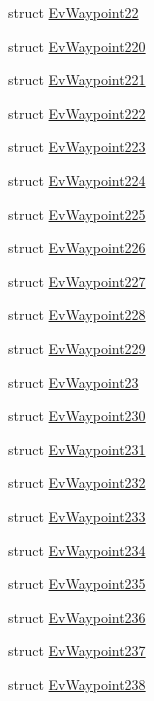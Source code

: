 \begin{DoxyCompactItemize}
struct \hyperlink{structcl__move__base__z_1_1EvWaypoint22}{Ev\+Waypoint22}
\item 
struct \hyperlink{structcl__move__base__z_1_1EvWaypoint220}{Ev\+Waypoint220}
\item 
struct \hyperlink{structcl__move__base__z_1_1EvWaypoint221}{Ev\+Waypoint221}
\item 
struct \hyperlink{structcl__move__base__z_1_1EvWaypoint222}{Ev\+Waypoint222}
\item 
struct \hyperlink{structcl__move__base__z_1_1EvWaypoint223}{Ev\+Waypoint223}
\item 
struct \hyperlink{structcl__move__base__z_1_1EvWaypoint224}{Ev\+Waypoint224}
\item 
struct \hyperlink{structcl__move__base__z_1_1EvWaypoint225}{Ev\+Waypoint225}
\item 
struct \hyperlink{structcl__move__base__z_1_1EvWaypoint226}{Ev\+Waypoint226}
\item 
struct \hyperlink{structcl__move__base__z_1_1EvWaypoint227}{Ev\+Waypoint227}
\item 
struct \hyperlink{structcl__move__base__z_1_1EvWaypoint228}{Ev\+Waypoint228}
\item 
struct \hyperlink{structcl__move__base__z_1_1EvWaypoint229}{Ev\+Waypoint229}
\item 
struct \hyperlink{structcl__move__base__z_1_1EvWaypoint23}{Ev\+Waypoint23}
\item 
struct \hyperlink{structcl__move__base__z_1_1EvWaypoint230}{Ev\+Waypoint230}
\item 
struct \hyperlink{structcl__move__base__z_1_1EvWaypoint231}{Ev\+Waypoint231}
\item 
struct \hyperlink{structcl__move__base__z_1_1EvWaypoint232}{Ev\+Waypoint232}
\item 
struct \hyperlink{structcl__move__base__z_1_1EvWaypoint233}{Ev\+Waypoint233}
\item 
struct \hyperlink{structcl__move__base__z_1_1EvWaypoint234}{Ev\+Waypoint234}
\item 
struct \hyperlink{structcl__move__base__z_1_1EvWaypoint235}{Ev\+Waypoint235}
\item 
struct \hyperlink{structcl__move__base__z_1_1EvWaypoint236}{Ev\+Waypoint236}
\item 
struct \hyperlink{structcl__move__base__z_1_1EvWaypoint237}{Ev\+Waypoint237}
\item 
struct \hyperlink{structcl__move__base__z_1_1EvWaypoint238}{Ev\+Waypoint238}
\item 

\end{DoxyCompactItemize}
